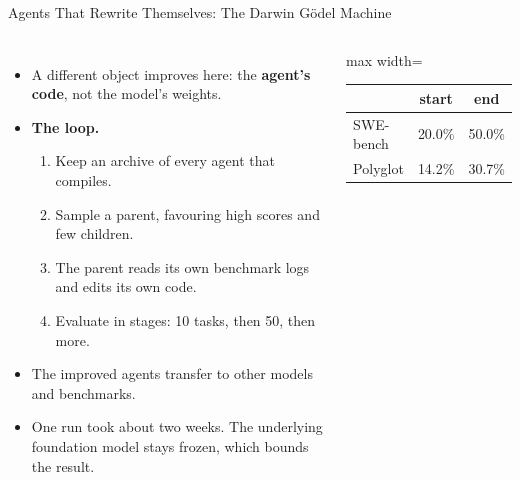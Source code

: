 \begin{frame}{Agents That Rewrite Themselves: The Darwin G\"odel Machine}
    \begin{columns}[T,onlytextwidth]
        \begin{itemize}\itemsep0.45em
            \item A different object improves here: the \textbf{agent's code}, not the model's weights.
            \item \textbf{The loop.}
            \begin{enumerate}\itemsep0.1em
                \item Keep an archive of every agent that compiles.
                \item Sample a parent, favouring high scores and few children.
                \item The parent reads its own benchmark logs and edits its own code.
                \item Evaluate in stages: 10 tasks, then 50, then more.
            \end{enumerate}
            \item The improved agents transfer to other models and benchmarks.
            \item One run took about two weeks. The underlying foundation model stays frozen, which bounds the result.
        \end{itemize}
        \centering
        \small
        \begin{adjustbox}{max width=\linewidth}\begin{tabular}{lcc}
            \toprule
            & \textbf{start} & \textbf{end} \\
            \midrule
            SWE-bench & 20.0\% & 50.0\% \\
            Polyglot & 14.2\% & 30.7\% \\
            \bottomrule
        \end{tabular}\end{adjustbox}

        \vspace{1em}
    \end{columns}
    \vspace{0.2em}
\end{frame}

